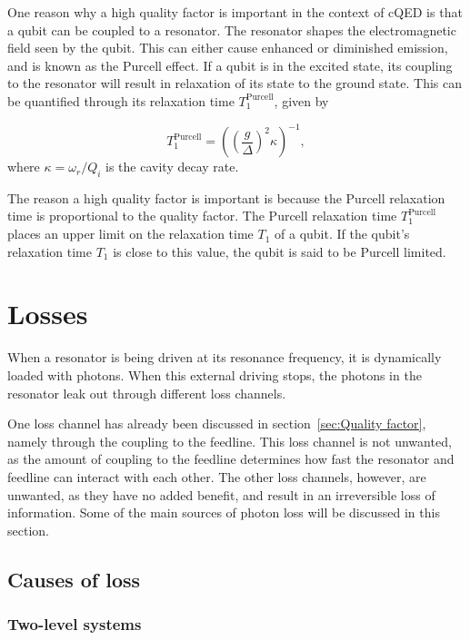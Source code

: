     One reason why a high quality factor is important in the context of cQED is that a qubit can be coupled to a resonator. The resonator shapes the electromagnetic field seen by the qubit. This can either cause enhanced or diminished emission, and is known as the Purcell effect. If a qubit is in the excited state, its coupling to the resonator will result in relaxation of its state to the ground state. This can be quantified through its relaxation time $T_1^\text{Purcell}$, given by~\cite{Reed}

    \begin{equation}
      T_1^\text{Purcell} = \left(\left(\frac{g}{\Delta}\right)^2\kappa\right)^{-1},
      \label{eq:purcell T1}
    \end{equation}
    where $\kappa=\omega_r/Q_i$ is the cavity decay rate.

    The reason a high quality factor is important is because the Purcell relaxation time is proportional to the quality factor. The Purcell relaxation time $T_1^\text{Purcell}$ places an upper limit on the relaxation time $T_1$ of a qubit. If the qubit's relaxation time $T_1$ is close to this value, the qubit is said to be Purcell limited.

  \section{Losses}
    \label{sec:Losses}

      When a resonator is being driven at its resonance frequency, it is dynamically loaded with photons. When this external driving stops, the photons in the resonator leak out through different loss channels.

      One loss channel has already been discussed in section~\ref{sec:Quality factor}, namely through the coupling to the feedline. This loss channel is not unwanted, as the amount of coupling to the feedline determines how fast the resonator and feedline can interact with each other. The other loss channels, however, are unwanted, as they have no added benefit, and result in an irreversible loss of information. Some of the main sources of photon loss will be discussed in this section.

  \subsection{Causes of loss}

    \subsubsection{Two-level systems}
      \label{sec:TLS}


